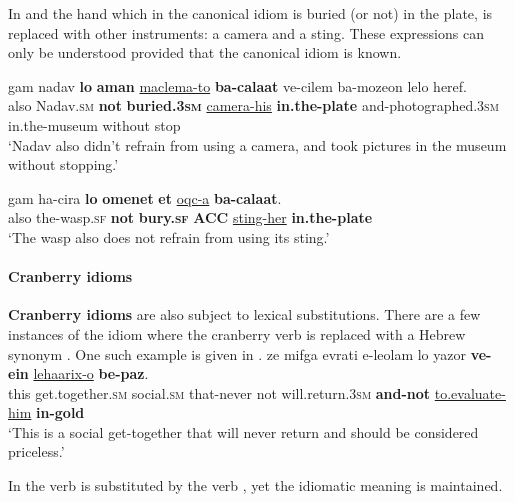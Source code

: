 \documentclass[output=paper]{langsci/langscibook}
\begin{document}
In  and  the hand which in the canonical idiom is buried (or not) in the plate, is replaced with other instruments: a camera and a sting. These expressions can only be understood provided that the canonical idiom is known.

    \ea\label{taman-sub-NP}
        \gll gam nadav \textbf{lo} \textbf{{\tet}aman} \underline{maclema-to} \textbf{ba-cala{\het}at} ve-cilem ba-moze{\alef}on lelo heref.\\
            also Nadav.\textsc{sm} \textbf{not} \textbf{buried.\textsc{3sm}} \underline{camera-his} \textbf{in.the-plate} and-photographed.\textsc{3sm} in.the-museum without stop\\
        \glt `Nadav also didn't refrain from using a camera, and took pictures in the museum without stopping.'
    \z

    \ea\label{taman-sub-PP}
        \gll gam ha-cir{\ayin}a \textbf{lo} \textbf{{\tet}omenet} \textbf{{\alef}et} \underline{{\ayin}oqc-a} \textbf{ba-cala{\het}at}.\\
            also the-wasp.\textsc{sf} \textbf{not} \textbf{bury.\textsc{sf}} \textbf{ACC} \underline{sting-her} \textbf{in.the-plate}\\
        \glt `The wasp also does not refrain from using its sting.'
    \z

\paragraph*{Cranberry idioms}

\textbf{Cranberry idioms} are also subject to lexical substitutions. There are a few instances of the idiom  where the cranberry verb  is replaced with a Hebrew synonym . One such example is given in .
	\ea\label{yesula-sub}
    	\gll ze mifga{\shin} {\het}evrati {\shin}e-le{\ayin}olam lo ya{\het}zor \textbf{ve-{\alef}ein} \underline{leha{\ayin}arix-o} \textbf{be-paz}.\\
    	   this get.together.\textsc{sm} social.\textsc{sm} that-never not will.return.\textsc{3sm} \textbf{and-not} \underline{to.evaluate-him} \textbf{in-gold}\\
    	\glt `This is a social get-together that will never return and should be considered priceless.'
	\z

In  the verb  is substituted by the verb , yet the idiomatic meaning is maintained.
\end{document}
